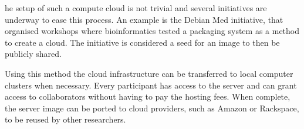 he setup of such a compute cloud is not trivial and several initiatives are underway to ease this process. An example is the Debian Med 
initiative, that organised workshops where bioinformatics tested a packaging system as a method to create a cloud. The initiative is 
considered a seed for an image to then be publicly shared.

Using this method the cloud infrastructure can be transferred to local computer clusters when necessary. Every participant has access 
to the server and can grant access to collaborators without having to pay the hosting fees. When complete, the server image can be 
ported to cloud providers, such as Amazon or Rackspace, to be reused by other researchers.





